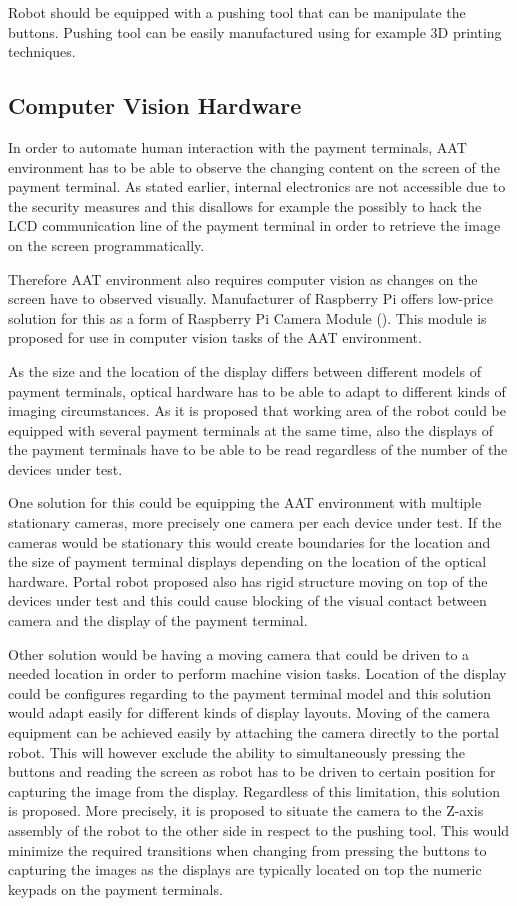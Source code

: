 Robot should be equipped with a pushing tool that can be manipulate the buttons. Pushing tool can be easily manufactured using for example 3D printing techniques.

\FloatBarrier
\subsection{Computer Vision Hardware}
\label{subsection:computer vision hardware}

In order to automate human interaction with the payment terminals, AAT environment has to be able to observe the changing content on the screen of the payment terminal. As stated earlier, internal electronics are not accessible due to the security measures and this disallows for example the possibly to hack the LCD communication line of the payment terminal in order to retrieve the image on the screen programmatically.

Therefore AAT environment also requires computer vision as changes on the screen have to observed visually. Manufacturer of Raspberry Pi offers low-price solution for this as a form of Raspberry Pi Camera Module (\emph{\cite{raspberry_camera}}). This module is proposed for use in computer vision tasks of the AAT environment.

As the size and the location of the display differs between different models of payment terminals, optical hardware has to be able to adapt to different kinds of imaging circumstances. As it is proposed that working area of the robot could be equipped with several payment terminals at the same time, also the displays of the payment terminals have to be able to be read regardless of the number of the devices under test.

One solution for this could be equipping the AAT environment with multiple stationary cameras, more precisely one camera per each device under test. If the cameras would be stationary this would create boundaries for the location and the size of payment terminal displays depending on the location of the optical hardware. Portal robot proposed also has rigid structure moving on top of the devices under test and this could cause blocking of the visual contact between camera and the display of the payment terminal.

Other solution would be having a moving camera that could be driven to a needed location in order to perform machine vision tasks. Location of the display could be configures regarding to the payment terminal model and this solution would adapt easily for different kinds of display layouts. Moving of the camera equipment can be achieved easily by attaching the camera directly to the portal robot. This will however exclude the ability to simultaneously pressing the buttons and reading the screen as robot has to be driven to certain position for capturing the image from the display. Regardless of this limitation, this solution is proposed. More precisely, it is proposed to situate the camera to the Z-axis assembly of the robot to the other side in respect to the pushing tool. This would minimize the required transitions when changing from pressing the buttons to capturing the images as the displays are typically located on top the numeric keypads on the payment terminals.

